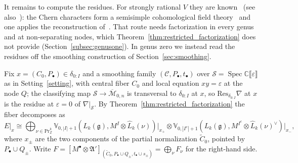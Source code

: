 \documentclass[12pt,a4paper,reqno]{amsart}
\numberwithin{equation}{section}
\theoremstyle{definition}
\newcommand{\g}{\mathfrak{g}}
\newcommand{\C}{\mathbb{C}}
\newcommand{\Z}{\mathbb{Z}}
\renewcommand{\S}{\mathcal{S}}
\newcommand{\M}{\mathcal{M}}
\newcommand{\CCC}{\mathscr{C}}
\newcommand{\lb}{\llbracket}
\newcommand{\rb}{\rrbracket}
\def\Pr{\mathrm{Pr}}
\def\o{\otimes}
\def\ra{\rightarrow}
\def\fA{\mathfrak{A}}
\def\Res{\mathrm{Res}}
\def\VV{\mathbb{V}}
\begin{document}
It remains to compute the residues. For strongly rational $V$ they are known~\cite[(2.4)]{DG} (see also~\cite[Theorem 2.13]{Chakravarty25}): the Chern characters form a semisimple cohomological field theory~\cite{DGT_CohFT} and one applies the reconstruction of~\cite[Lemma 2.2]{MOPPZ}. That route needs factorization in every genus and at non-separating nodes, which Theorem~\ref{thm:restricted_factorization} does not provide (Section~\ref{subsec:genusone}). In genus zero we instead read the residues off the smoothing construction of Section~\ref{sec:smoothing}.

Fix $x=(C_0,P_\bullet)\in\delta_{0:I}$ and a smoothing family $(\CCC,P_\bullet,t_\bullet)$ over $\S=\operatorname{Spec}\C\lb\varepsilon\rb$ as in Setting~\ref{setting}, with central fiber $C_0$ and local equation $xy=\varepsilon$ at the node $Q$; the classifying map $\S\ra\overline{\M}_{0,n}$ is transversal to $\delta_{0:I}$ at $x$, so $\Res_{\delta_{0:I}}\nabla$ at $x$ is the residue at $\varepsilon=0$ of $\nabla|_\S$. By Theorem~\ref{thm:restricted_factorization} the fiber decomposes as
\begin{equation}\label{eq:boundary_restriction}
E|_x\cong \bigoplus_{\nu\in \Pr^k_\Z} \VV_{0,|I|+1}\left(L_k(\g),M^I\o \hat{L}_k(\nu)\right)\big|_{x_+}\o \VV_{0,|I^c|+1}\left(L_k(\g),M^{I^c}\o\hat{L}_k(\nu)^\vee\right)\big|_{x_-},
\end{equation}
where $x_\pm$ are the two components of the partial normalization $\widetilde{C}_0$, pointed by $P_\bullet\cup Q_\pm$. Write $F=[M^\bullet\o\fA']_{(\widetilde{C}_0,P_\bullet\cup Q_\pm,t_\bullet\cup s_\pm)}=\bigoplus_\nu F_\nu$ for the right-hand side.
\end{document}
